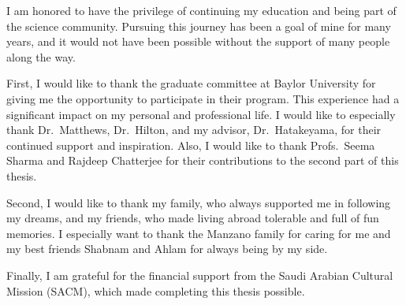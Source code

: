 I am honored to have the privilege of continuing my education and being part of the science community.
Pursuing this journey has been a goal of mine for many years, and it would not have been possible without the support of many people along the way.

First, I would like to thank the graduate committee at Baylor University for giving me the opportunity to participate in their program.
This experience had a significant impact on my personal and professional life.
I would like to especially thank Dr.\ Matthews, Dr.\ Hilton, and my advisor, Dr.\ Hatakeyama, for their continued support and inspiration.
Also, I would like to thank Profs.\ Seema Sharma and Rajdeep Chatterjee for their contributions to the second part of this thesis.

Second, I would like to thank my family, who always supported me in following my dreams, and my friends, who made living abroad tolerable and full of fun memories.
I especially want to thank the Manzano family for caring for me and my best friends Shabnam and Ahlam for always being by my side.

Finally, I am grateful for the financial support from the Saudi Arabian Cultural Mission (SACM), which made completing this thesis possible.
